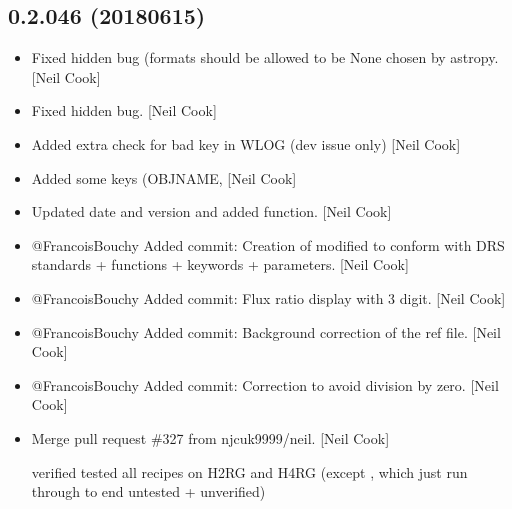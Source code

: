 \documentclass[a4paper,10pt,english]{report}
\begin{document}
\subsection{0.2.046 (2018\sphinxhyphen{}06\sphinxhyphen{}15)}
\label{\detokenize{misc/changelog:id437}}\begin{itemize}
\item {} 
Fixed hidden bug (formats should be allowed to be None \sphinxhyphen{} chosen by
astropy. {[}Neil Cook{]}

\item {} 
Fixed hidden bug. {[}Neil Cook{]}

\item {} 
Added extra check for bad key in WLOG (dev issue only) {[}Neil Cook{]}

\item {} 
Added some keys (OBJNAME,  {[}Neil Cook{]}

\item {} 
Updated date and version and added  function. {[}Neil
Cook{]}

\item {} 
@FrancoisBouchy \sphinxhyphen{} Added commit: Creation of  \sphinxhyphen{}
modified to conform with DRS standards + functions + keywords +
parameters. {[}Neil Cook{]}

\item {} 
@FrancoisBouchy \sphinxhyphen{} Added commit: Flux ratio display with 3 digit. {[}Neil
Cook{]}

\item {} 
@FrancoisBouchy \sphinxhyphen{} Added commit: Background correction of the ref file.
{[}Neil Cook{]}

\item {} 
@FrancoisBouchy \sphinxhyphen{} Added commit: Correction to avoid division by zero.
{[}Neil Cook{]}

\item {} 
Merge pull request \#327 from njcuk9999/neil. {[}Neil Cook{]}

verified \sphinxhyphen{} tested all recipes on H2RG and H4RG (except ,  \sphinxhyphen{} which just run through to end \sphinxhyphen{} untested + unverified)

\end{itemize}
\end{document}
